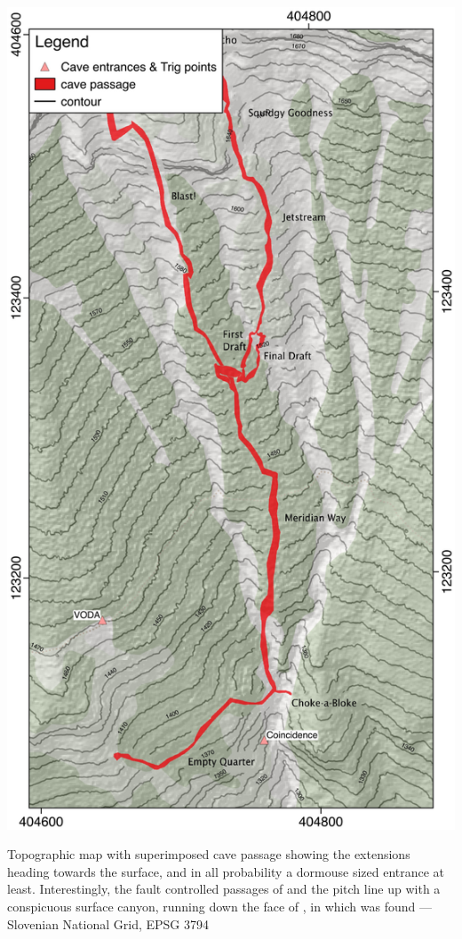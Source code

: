 \begin{map}[t!]
\checkoddpage \ifoddpage \forcerectofloat \else \forceversofloat \fi
\centering
\includegraphics[width=\textwidth]{images/2015/tanguy-meridian-2015/meridian_map.pdf}
\caption[Meridian way topographic map]{Topographic map with superimposed cave passage showing the \protect{} extensions heading towards the surface, and in all probability a dormouse sized entrance at least. Interestingly, the fault controlled passages of \protect{} and the \protect{} pitch line up with a conspicuous surface canyon, running down the face of \protect{}, in which \protect{} was found --- Slovenian National Grid, EPSG 3794}
\label{meridian map}
\end{map}


